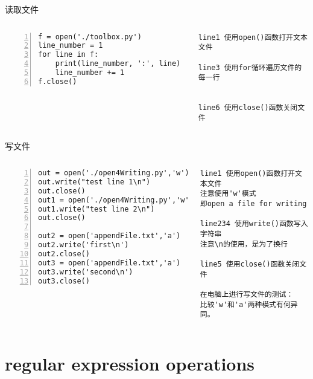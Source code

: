 \documentclass{beamer}
\begin{document}
\begin{frame}[fragile]{读取文件}

\begin{columns}
\begin{Verbatim}[numbers=left,frame=single,rulecolor=\color{red}]
f = open('./toolbox.py')
line_number = 1
for line in f:
    print(line_number, ':', line)
    line_number += 1
f.close()
\end{Verbatim}
\tiny{
\begin{Verbatim}[numbers=none,frame=none,rulecolor=\color{red}]
line1 使用open()函数打开文本文件

line3 使用for循环遍历文件的每一行

  
line6 使用close()函数关闭文件
\end{Verbatim}
}
\end{columns}
\end{frame}

\begin{frame}[fragile]{写文件}

\begin{columns}
\begin{Verbatim}[numbers=left,frame=single,rulecolor=\color{red}]
out = open('./open4Writing.py','w')
out.write("test line 1\n")
out.close()
out1 = open('./open4Writing.py','w')
out1.write("test line 2\n")
out.close()

out2 = open('appendFile.txt','a')
out2.write('first\n')
out2.close()
out3 = open('appendFile.txt','a')
out3.write('second\n')
out3.close()
\end{Verbatim}
\tiny{
\begin{Verbatim}[numbers=none,frame=none,rulecolor=\color{red}]
line1 使用open()函数打开文本文件
注意使用'w'模式
即open a file for writing

line234 使用write()函数写入字符串
注意\n的使用，是为了换行
  
line5 使用close()函数关闭文件

在电脑上进行写文件的测试：
比较'w'和'a'两种模式有何异同。
\end{Verbatim}
}
\end{columns}
\end{frame}
\section{regular expression operations}
\end{document}
